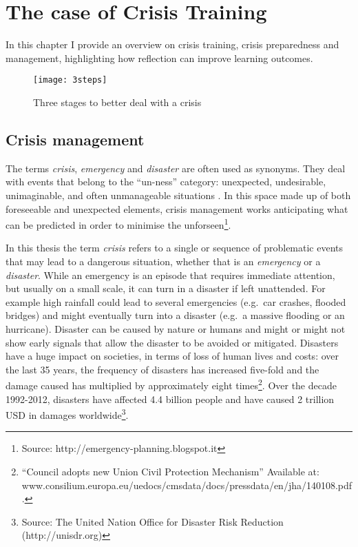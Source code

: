 \chapter{The case of Crisis Training}\label{crisis}


In this chapter I provide an overview on crisis training, crisis preparedness and management, highlighting how reflection can improve learning outcomes.
\begin{figure}
	[h!] \centering 
	\texttt{[image: 3steps]} \caption{Three stages to better deal with a crisis} \label{fig:three-stages} 
\end{figure}


\section{Crisis management}\label{crisis-management}

The terms \emph{crisis}, \emph{emergency} and \emph{disaster} are often used as synonyms. They deal with events that belong to the ``un-ness'' category: unexpected, undesirable, unimaginable, and often unmanageable situations \autocites{Boin:2007wt}{hewit}. In this space made up of both foreseeable and unexpected elements, crisis management works anticipating what can be predicted in order to minimise the unforseen\footnote{Source: http://emergency-planning.blogspot.it}.

In this thesis the term \emph{crisis} refers to a single or sequence of problematic events that may lead to a dangerous situation, whether that is an \emph{emergency} or a \emph{disaster}. While an emergency is an episode that requires immediate attention, but usually on a small scale, it can turn in a disaster if left unattended. For example high rainfall could lead to several emergencies (e.g.~car crashes, flooded bridges) and might eventually turn into a disaster (e.g.~a massive flooding or an hurricane). Disaster can be caused by nature or humans and might or might not show early signals that allow the disaster to be avoided or mitigated. Disasters have a huge impact on societies, in terms of loss of human lives and costs: over the last 35 years, the frequency of disasters has increased five-fold and the damage caused has multiplied by approximately eight times\footnote{``Council adopts new Union Civil Protection Mechanism'' Available at: www.consilium.europa.eu/uedocs/cmsdata/docs/pressdata/en/jha/140108.pdf.}. Over the decade 1992-2012, disasters have affected 4.4 billion people and have caused 2 trillion USD in damages worldwide\footnote{Source: The United Nation Office for Disaster Risk Reduction (http://unisdr.org)}.

